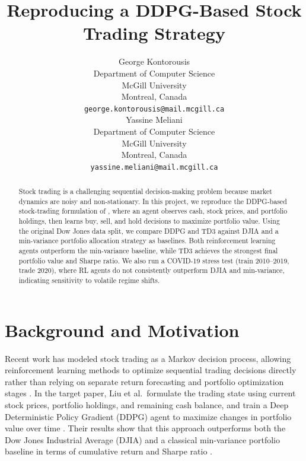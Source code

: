 \documentclass{article}
\title{Reproducing a DDPG-Based Stock Trading Strategy}
\author{%
  George Kontorousis \\
  Department of Computer Science\\
  McGill University\\
  Montreal, Canada \\
  \texttt{george.kontorousis@mail.mcgill.ca} \\
  \And
  Yassine Meliani \\
  Department of Computer Science\\
  McGill University\\
  Montreal, Canada \\
  \texttt{yassine.meliani@mail.mcgill.ca} \\
}
\begin{document}
\maketitle




\begin{abstract}
Stock trading is a challenging sequential decision-making problem because market dynamics are noisy and non-stationary. In this project, we reproduce the DDPG-based stock-trading formulation of \citet{liu2018practical}, where an agent observes cash, stock prices, and portfolio holdings, then learns buy, sell, and hold decisions to maximize portfolio value. Using the original Dow Jones data split, we compare DDPG and TD3 against DJIA and a min-variance portfolio allocation strategy as baselines. Both reinforcement learning agents outperform the min-variance baseline, while TD3 achieves the strongest final portfolio value and Sharpe ratio. We also run a COVID-19 stress test (train 2010--2019, trade 2020), where RL agents do not consistently outperform DJIA and min-variance, indicating sensitivity to volatile regime shifts.
\end{abstract}

\section{Background and Motivation}

Recent work has modeled stock trading as a Markov decision process, allowing reinforcement learning methods to optimize sequential trading decisions directly rather than relying on separate return forecasting and portfolio optimization stages \cite{liu2018practical}. In the target paper, Liu et al.\ formulate the trading state using current stock prices, portfolio holdings, and remaining cash balance, and train a Deep Deterministic Policy Gradient (DDPG) agent to maximize changes in portfolio value over time \cite{liu2018practical}. Their results show that this approach outperforms both the Dow Jones Industrial Average (DJIA) and a classical min-variance portfolio baseline in terms of cumulative return and Sharpe ratio \cite{liu2018practical}.
\end{document}

